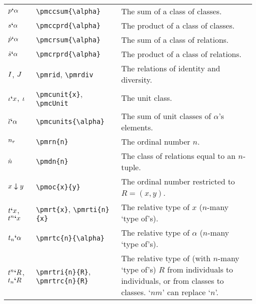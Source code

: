 \documentclass[12pt]{article}
\begin{document}
\begin{tabular}{@{}p{3cm} | p{5cm} | p{8.25cm}}
	$p\textbf{`}\alpha$ & \verb|\pmccsum{\alpha}| & The sum of a class of classes. \\
	$s\textbf{`}\alpha$ & \verb|\pmccprd{\alpha}| & The product of a class of classes. \\
	$\dot{p}\textbf{`}\alpha$ & \verb|\pmcrsum{\alpha}| & The sum of a class of relations. \\
	$\dot{s}\textbf{`}\alpha$ & \verb|\pmcrprd{\alpha}| & The product of a class of relations. \\
	$I$, $J$ & \verb|\pmrid|, \verb|\pmrdiv| & The relations of identity and diversity. \\
	$\iota\textbf{`}x$, $\iota$ & \verb|\pmcunit{x}|, \verb|\pmcUnit| & The unit class. \\
	$\breve{\iota}\textbf{`}\alpha$ & \verb|\pmcunits{\alpha}| & The sum of unit classes of $\alpha$'s elements. \\
	$n_r$ & \verb|\pmrn{n}| & The ordinal number $n$. \\
	$\dot{n}$ & \verb|\pmdn{n}| & The class of relations equal to an $n$-tuple. \\
	$x \boldsymbol{\downarrow} y$ & \verb|\pmoc{x}{y}| & The ordinal number restricted to $R=(x,y)$. \\
	$t\textbf{`}x$, $t^{n}\textbf{`}x$ & \verb|\pmrt{x}|, \verb|\pmrti{n}{x}| & The relative type of $x$ ($n$-many `type of's). \\
	$t_{n}\textbf{`}\alpha$ & \verb|\pmrtc{n}{\alpha}| & The relative type of $\alpha$ ($n$-many `type of's). \\
	$t^{n}\textbf{`}R$, $t_{n}\textbf{`}R$ & \verb|\pmrtri{n}{R}|,  \verb|\pmrtrc{n}{R}| & The relative type of (with $n$-many `type of's) $R$ from individuals to individuals, or from classes to classes. `$nm$' can replace `$n$'. 
\end{tabular}
\end{document}
